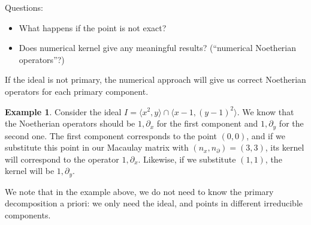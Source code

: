 \documentclass[letterpaper]{article}
\theoremstyle{plain}
\theoremstyle{definition}
\newtheorem{example}[theorem]{Example}
\theoremstyle{remark}
\begin{document}
Questions:
\begin{itemize}
	\item What happens if the point is not exact?
	\item Does numerical kernel give any meaningful results? (``numerical Noetherian operators''?)
\end{itemize}

If the ideal is not primary, the numerical approach will give us correct Noetherian operators for each primary component.
\begin{example}
	Consider the ideal $I = \langle x^2, y\rangle \cap \langle x-1, (y-1)^2 \rangle$. We know that the Noetherian operators should be $1, \partial_x$ for the first component and $1, \partial_y$ for the second one. The first component corresponds to the point $(0,0)$, and if we substitute this point in our Macaulay matrix with $(n_x, n_\partial) = (3,3)$, its kernel will correspond to the operator $1,\partial_x$. Likewise, if we substitute $(1,1)$, the kernel will be $1,\partial_y$.
\end{example}
We note that in the example above, we do not need to know the primary decomposition a priori: we only need the ideal, and points in different irreducible components.
\end{document}
